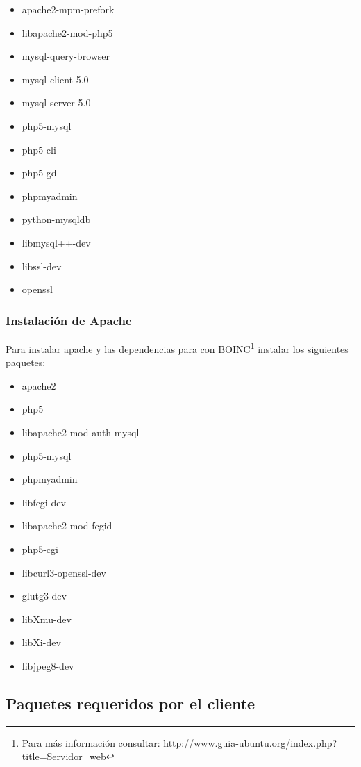 \documentclass[12pt,spanish,a4paper]{report}
\begin{document}
\begin{itemize}
\item apache2-mpm-prefork \item libapache2-mod-php5 \item mysql-query-browser \item mysql-client-5.0 \item mysql-server-5.0 \item php5-mysql \item php5-cli \item php5-gd \item phpmyadmin \item python-mysqldb \item libmysql++-dev \item libssl-dev \item openssl
\end{itemize}

\subsubsection{Instalación de Apache}

Para instalar apache y las dependencias para con BOINC\footnote{Para más información consultar: \url{http://www.guia-ubuntu.org/index.php?title=Servidor_web}} instalar los siguientes paquetes:

\begin{itemize}
\item apache2 \item php5 \item libapache2-mod-auth-mysql \item php5-mysql \item phpmyadmin \item libfcgi-dev \item libapache2-mod-fcgid \item php5-cgi \item libcurl3-openssl-dev \item glutg3-dev \item libXmu-dev \item libXi-dev \item libjpeg8-dev
\end{itemize}

\subsection{Paquetes requeridos por el cliente}
\end{document}

